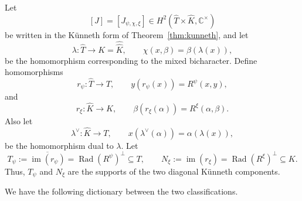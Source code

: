 \documentclass{amsart}
\theoremstyle{definition}
\newcommand{\Rad}{\operatorname{Rad}}
\newcommand{\Ctimes}{\mathbb{C}^{\times}}
\numberwithin{equation}{section}
\begin{document}
Let
\[
 [J]=[J_{\psi,\chi,\xi}]
 \in H^2(\widehat T\times \widehat K,\Ctimes)
\]
be written in the K\"unneth form of Theorem~\ref{thm:kunneth}, and let
\[
 \lambda:\widehat T\longrightarrow K=\widehat{\widehat K},
 \qquad
 \chi(x,\beta)=\beta(\lambda(x)),
\]
be the homomorphism corresponding to the mixed bicharacter.  Define
homomorphisms
\[
 r_\psi:\widehat T\longrightarrow T,
 \qquad
 y(r_\psi(x))=R^\psi(x,y),
\]
and
\[
 r_\xi:\widehat K\longrightarrow K,
 \qquad
 \beta(r_\xi(\alpha))=R^\xi(\alpha,\beta).
\]
Also let
\[
 \lambda^\vee:\widehat K\longrightarrow T,
 \qquad
 x(\lambda^\vee(\alpha))=\alpha(\lambda(x)),
\]
be the homomorphism dual to $\lambda$.  Let
\[
 T_\psi:=\overline{\operatorname{im}(r_\psi)}
       =\Rad(R^\psi)^\perp\subseteq T,
 \qquad
 N_\xi:=\operatorname{im}(r_\xi)
       =\Rad(R^\xi)^\perp\subseteq K.
\]
Thus, $T_\psi$ and $N_\xi$ are the supports of the two diagonal K\"unneth
components.

We have the following dictionary between the two classifications.
\end{document}
